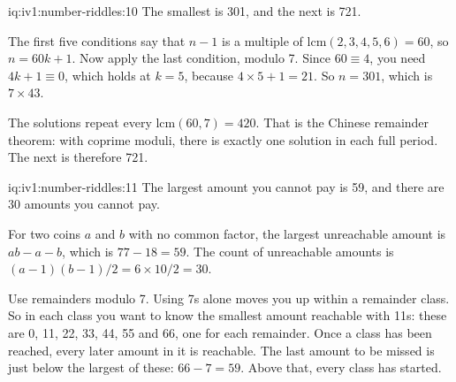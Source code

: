 \begin{solution}{iq:iv1:number-riddles:10}
The smallest is 301, and the next is 721.

The first five conditions say that $n - 1$ is a multiple of $\mathrm{lcm}(2, 3, 4, 5, 6) = 60$, so $n = 60k + 1$. Now apply the last condition, modulo 7. Since $60 \equiv 4$, you need $4k + 1 \equiv 0$, which holds at $k = 5$, because $4 \times 5 + 1 = 21$. So $n = 301$, which is $7 \times 43$.

The solutions repeat every $\mathrm{lcm}(60, 7) = 420$. That is the Chinese remainder theorem: with coprime moduli, there is exactly one solution in each full period. The next is therefore 721.

\end{solution}

\begin{solution}{iq:iv1:number-riddles:11}
The largest amount you cannot pay is 59, and there are 30 amounts you cannot pay.

For two coins $a$ and $b$ with no common factor, the largest unreachable amount is $ab - a - b$, which is $77 - 18 = 59$. The count of unreachable amounts is $(a - 1)(b - 1)/2 = 6 \times 10 / 2 = 30$.

Use remainders modulo 7. Using 7s alone moves you up within a remainder class. So in each class you want to know the smallest amount reachable with 11s: these are 0, 11, 22, 33, 44, 55 and 66, one for each remainder. Once a class has been reached, every later amount in it is reachable. The last amount to be missed is just below the largest of these: $66 - 7 = 59$. Above that, every class has started.

\end{solution}

